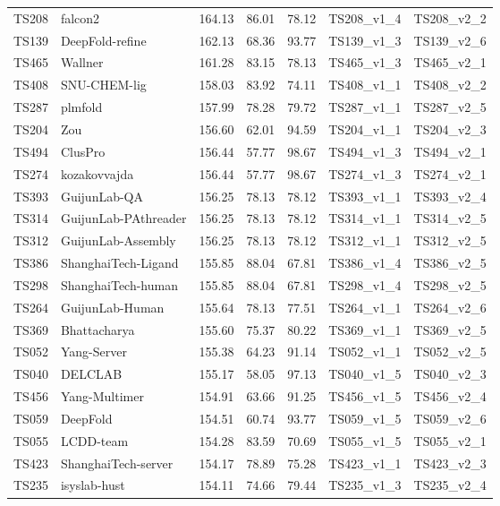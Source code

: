 \begin{longtable}{lllllll}
TS208 & falcon2 & 164.13 & 86.01 & 78.12 & TS208\_v1\_4 & TS208\_v2\_2 \\ 
TS139 & DeepFold-refine & 162.13 & 68.36 & 93.77 & TS139\_v1\_3 & TS139\_v2\_6 \\ 
TS465 & Wallner & 161.28 & 83.15 & 78.13 & TS465\_v1\_3 & TS465\_v2\_1 \\ 
TS408 & SNU-CHEM-lig & 158.03 & 83.92 & 74.11 & TS408\_v1\_1 & TS408\_v2\_2 \\ 
TS287 & plmfold & 157.99 & 78.28 & 79.72 & TS287\_v1\_1 & TS287\_v2\_5 \\ 
TS204 & Zou & 156.60 & 62.01 & 94.59 & TS204\_v1\_1 & TS204\_v2\_3 \\ 
TS494 & ClusPro & 156.44 & 57.77 & 98.67 & TS494\_v1\_3 & TS494\_v2\_1 \\ 
TS274 & kozakovvajda & 156.44 & 57.77 & 98.67 & TS274\_v1\_3 & TS274\_v2\_1 \\ 
TS393 & GuijunLab-QA & 156.25 & 78.13 & 78.12 & TS393\_v1\_1 & TS393\_v2\_4 \\ 
TS314 & GuijunLab-PAthreader & 156.25 & 78.13 & 78.12 & TS314\_v1\_1 & TS314\_v2\_5 \\ 
TS312 & GuijunLab-Assembly & 156.25 & 78.13 & 78.12 & TS312\_v1\_1 & TS312\_v2\_5 \\ 
TS386 & ShanghaiTech-Ligand & 155.85 & 88.04 & 67.81 & TS386\_v1\_4 & TS386\_v2\_5 \\ 
TS298 & ShanghaiTech-human & 155.85 & 88.04 & 67.81 & TS298\_v1\_4 & TS298\_v2\_5 \\ 
TS264 & GuijunLab-Human & 155.64 & 78.13 & 77.51 & TS264\_v1\_1 & TS264\_v2\_6 \\ 
TS369 & Bhattacharya & 155.60 & 75.37 & 80.22 & TS369\_v1\_1 & TS369\_v2\_5 \\ 
TS052 & Yang-Server & 155.38 & 64.23 & 91.14 & TS052\_v1\_1 & TS052\_v2\_5 \\ 
TS040 & DELCLAB & 155.17 & 58.05 & 97.13 & TS040\_v1\_5 & TS040\_v2\_3 \\ 
TS456 & Yang-Multimer & 154.91 & 63.66 & 91.25 & TS456\_v1\_5 & TS456\_v2\_4 \\ 
TS059 & DeepFold & 154.51 & 60.74 & 93.77 & TS059\_v1\_5 & TS059\_v2\_6 \\ 
TS055 & LCDD-team & 154.28 & 83.59 & 70.69 & TS055\_v1\_5 & TS055\_v2\_1 \\ 
TS423 & ShanghaiTech-server & 154.17 & 78.89 & 75.28 & TS423\_v1\_1 & TS423\_v2\_3 \\ 
TS235 & isyslab-hust & 154.11 & 74.66 & 79.44 & TS235\_v1\_3 & TS235\_v2\_4 \\ 

\end{longtable}
